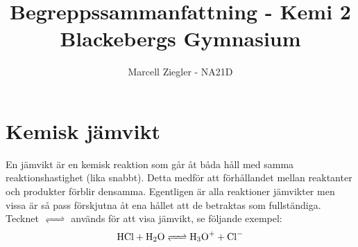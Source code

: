 \documentclass[12pt]{article}
\title{Begreppssammanfattning - Kemi 2 \\ Blackebergs Gymnasium}
\author{Marcell Ziegler - NA21D}
\begin{document}
    \begin{titlepage}
        \maketitle
    \end{titlepage}

    \tableofcontents

    \newpage

    \part{Kemisk jämvikt}
    
    En jämvikt är en kemisk reaktion som går åt båda håll med samma reaktionshastighet (lika snabbt). Detta medför att förhållandet mellan reaktanter och produkter förblir densamma. Egentligen är alla reaktioner jämvikter men vissa är så pass förskjutna åt ena hållet att de betraktas som fullständiga. Tecknet $\ce{<=>}$ används för att visa jämvikt, se följande exempel:
    \begin{equation*}
        \ce{HCl + H2O <=> H3O+ + Cl-}
    \end{equation*}

    
    \setcounter{exm}{0}
    
\end{document}
